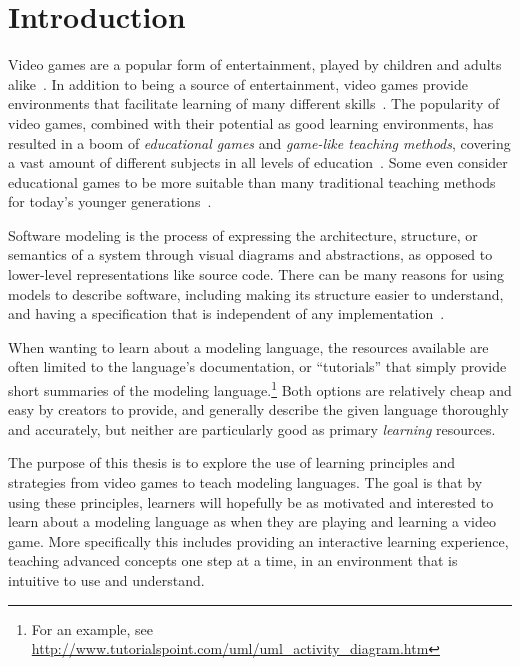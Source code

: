 \chapter{Introduction}
\label{ch:intro}
Video games are a popular form of entertainment, played by children and adults alike~\cite{esa:gamer_data}. In addition to being a source of entertainment, video games provide environments that facilitate learning of many different skills~\cite{gee:video_games_learning}. The popularity of video games, combined with their potential as good learning environments, has resulted in a boom of \emph{educational games} and \emph{game-like teaching methods}, covering a vast amount of different subjects in all levels of education~\cite{esper:codespells, ma:serious_games, pattis:karel_the_robot, resnick:scratch}. Some even consider educational games to be more suitable than many traditional teaching methods for today's younger generations~\cite{nea:four_cs, shaffer:epistemic_games}.

\noindent
Software modeling is the process of expressing the architecture, structure, or semantics of a system through visual diagrams and abstractions, as opposed to lower-level representations like source code. There can be many reasons for using models to describe software, including making its structure easier to understand, and having a specification that is independent of any implementation~\cite{braek:itut_methodologies, selic:model_driven_development}.

\noindent
When wanting to learn about a modeling language, the resources available are often limited to the language's documentation, or ``tutorials'' that simply provide short summaries of the modeling language.\footnote{For an example, see \url{http://www.tutorialspoint.com/uml/uml_activity_diagram.htm}} Both options are relatively cheap and easy by creators to provide, and generally describe the given language thoroughly and accurately, but neither are particularly good as primary \emph{learning} resources.

\noindent
The purpose of this thesis is to explore the use of learning principles and strategies from video games to teach modeling languages. The goal is that by using these principles, learners will hopefully be as motivated and interested to learn about a modeling language as when they are playing and learning a video game. More specifically this includes providing an interactive learning experience, teaching advanced concepts one step at a time, in an environment that is intuitive to use and understand.

